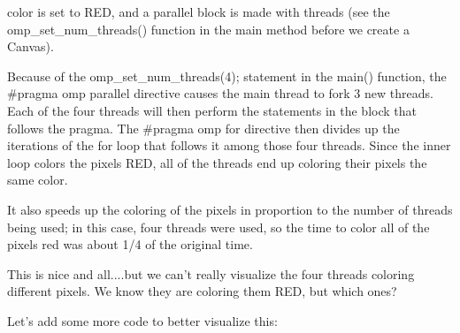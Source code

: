 {\ttfamily color} is set to {\ttfamily R\-E\-D}, and a parallel block is made with {} threads (see the {\ttfamily omp\-\_\-set\-\_\-num\-\_\-threads()} function in the main method before we create a Canvas).

Because of the {\ttfamily omp\-\_\-set\-\_\-num\-\_\-threads(4);} statement in the {\ttfamily main()} function, the {\ttfamily \#pragma omp parallel} directive causes the main thread to fork 3 new threads. Each of the four threads will then perform the statements in the block that follows the {\ttfamily pragma}. The {\ttfamily \#pragma omp for} directive then divides up the iterations of the {\ttfamily for} loop that follows it among those four threads. Since the inner loop colors the pixels {\ttfamily R\-E\-D}, all of the threads end up coloring their pixels the same color.

It also speeds up the coloring of the pixels in proportion to the number of threads being used; in this case, four threads were used, so the time to color all of the pixels red was about 1/4 of the original time.

This is nice and all....but we can't really visualize the four threads coloring different pixels. We know they are coloring them {\ttfamily R\-E\-D}, but which ones?

Let's add some more code to better visualize this\-:


